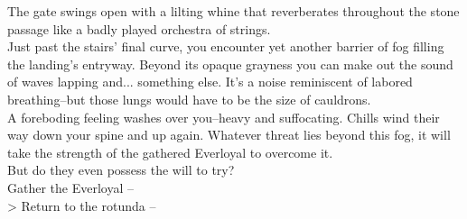 The gate swings open with a lilting whine that reverberates throughout the stone passage like a badly played orchestra of strings.\\

Just past the stairs' final curve, you encounter yet another barrier of fog filling the landing's entryway. Beyond its opaque grayness you can make out the sound of waves lapping and... something else. It's a noise reminiscent of labored breathing--but those lungs would have to be the size of cauldrons.\\

A foreboding feeling washes over you--heavy and suffocating. Chills wind their way down your spine and up again. Whatever threat lies beyond this fog, it will take the strength of the gathered Everloyal to overcome it.\\

But do they even possess the will to try?\\

 Gather the Everloyal -- \\ 
> Return to the rotunda -- 
